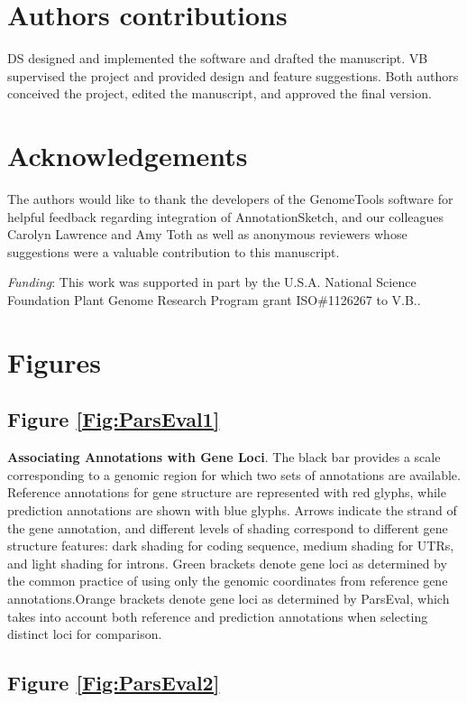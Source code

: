 \section{Authors contributions}
DS designed and implemented the software and drafted the manuscript.
VB supervised the project and provided design and feature suggestions.
Both authors conceived the project, edited the manuscript, and approved the final version.


\section{Acknowledgements}
The authors would like to thank the developers of the GenomeTools software for helpful feedback regarding integration of AnnotationSketch, and our colleagues Carolyn Lawrence and Amy Toth as well as anonymous reviewers whose suggestions were a valuable contribution to this manuscript.

\emph{Funding}: This work was supported in part by the U.S.A. National Science Foundation Plant Genome Research Program grant ISO\#1126267 to V.B..

\newpage

\section{Figures}

\subsection*{Figure \ref{Fig:ParsEval1}}

\noindent
\textbf{Associating Annotations with Gene Loci}.
The black bar provides a scale corresponding to a genomic region for which two sets of
annotations are available. Reference annotations for gene structure are represented with red glyphs, while prediction annotations are shown with
blue glyphs. Arrows indicate the strand of the gene annotation, and different levels of shading correspond to different gene structure features: dark
shading for coding sequence, medium shading for UTRs, and light shading for introns. Green brackets denote gene loci as determined by the
common practice of using only the genomic coordinates from reference gene annotations.Orange brackets denote gene loci as determined by
ParsEval, which takes into account both reference and prediction annotations when selecting distinct loci for comparison.

\subsection*{Figure \ref{Fig:ParsEval2}}

